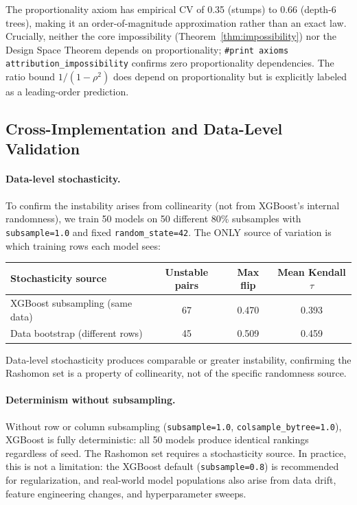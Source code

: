 \documentclass{article}
\begin{document}
The proportionality axiom has empirical CV of 0.35 (stumps) to 0.66 (depth-6 trees), making it an order-of-magnitude approximation rather than an exact law. Crucially, neither the core impossibility (Theorem~\ref{thm:impossibility}) nor the Design Space Theorem depends on proportionality; \texttt{\#print axioms attribution\_impossibility} confirms zero proportionality dependencies. The ratio bound $1/(1{-}\rho^2)$ does depend on proportionality but is explicitly labeled as a leading-order prediction.

\subsection{Cross-Implementation and Data-Level Validation}
\label{sec:mechanism-isolation}

\paragraph{Data-level stochasticity.}
To confirm the instability arises from collinearity (not from XGBoost's internal randomness), we train 50 models on 50 different 80\% subsamples with \texttt{subsample=1.0} and fixed \texttt{random\_state=42}. The ONLY source of variation is which training rows each model sees:

\begin{center}
\small
\begin{tabular}{@{}lccc@{}}
\toprule
Stochasticity source & Unstable pairs & Max flip & Mean Kendall $\tau$ \\
\midrule
XGBoost subsampling (same data) & 67 & 0.470 & 0.393 \\
Data bootstrap (different rows) & 45 & 0.509 & 0.459 \\
\bottomrule
\end{tabular}
\end{center}

Data-level stochasticity produces comparable or greater instability, confirming the Rashomon set is a property of collinearity, not of the specific randomness source.

\paragraph{Determinism without subsampling.}
\begin{sloppypar}
Without row or column subsampling (\texttt{subsample=1.0},
\texttt{colsample\_bytree=1.0}), XGBoost is fully deterministic: all 50 models
produce identical rankings regardless of seed. The Rashomon set requires a
stochasticity source. In practice, this is not a limitation: the XGBoost default
(\texttt{subsample=0.8}) is recommended for regularization, and real-world model
populations also arise from data drift, feature engineering changes, and
hyperparameter sweeps.
\end{sloppypar}
\end{document}
